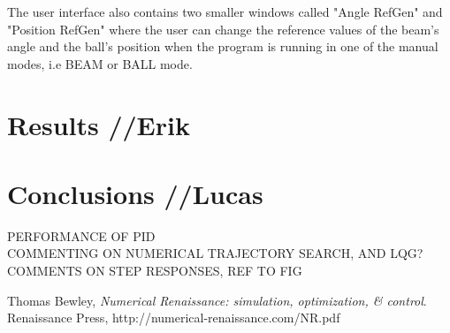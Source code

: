 \documentclass{article}
\begin{document}
The user interface also contains two smaller windows called "Angle RefGen" and "Position RefGen" where the user can change the reference values of the beam's angle and the ball's position when the program is running in one of the manual modes, i.e BEAM or BALL mode.
\section{Results //Erik}


\section{Conclusions //Lucas}
PERFORMANCE OF PID \\
COMMENTING ON NUMERICAL TRAJECTORY SEARCH, AND LQG? \\
COMMENTS ON STEP RESPONSES, REF TO FIG \\

\newpage
\begin{thebibliography}{9}
  Thomas Bewley,
  \emph{Numerical Renaissance: simulation, optimization, \& control}.
  Renaissance Press,
  http://numerical-renaissance.com/NR.pdf

\end{thebibliography}
\end{document}
